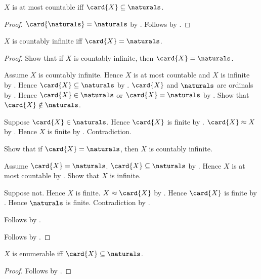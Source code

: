 \begin{theorem}\label{at_most_countable_iff_card_subseteq_naturals}
    $X$ is at most countable iff $\card{X}\subseteq\naturals$.
\end{theorem}
\begin{proof}
    $\card{\naturals}=\naturals$ by .
    Follows by
        .
\end{proof}

\begin{theorem}\label{countably_infinite_iff_card_naturals}
    $X$ is countably infinite iff $\card{X}=\naturals$.
\end{theorem}
\begin{proof}
    Show that if $X$ is countably infinite, then
        $\card{X}=\naturals$.
    \begin{subproof}
        Assume $X$ is countably infinite.
        Hence $X$ is at most countable and $X$ is infinite
            by .
        Hence $\card{X}\subseteq\naturals$
            by .
        $\card{X}$ and $\naturals$ are ordinals
            by .
        Hence $\card{X}\in\naturals$ or
            $\card{X}=\naturals$
            by .
        Show that $\card{X}\notin\naturals$.
        \begin{subproof}
            Suppose $\card{X}\in\naturals$.
            Hence $\card{X}$ is finite
                by .
            $\card{X}\approx X$ by .
            Hence $X$ is finite by .
            Contradiction.
        \end{subproof}
    \end{subproof}
    Show that if $\card{X}=\naturals$, then
        $X$ is countably infinite.
    \begin{subproof}
        Assume $\card{X}=\naturals$.
        $\card{X}\subseteq\naturals$ by .
        Hence $X$ is at most countable
            by .
        Show that $X$ is infinite.
        \begin{subproof}
            Suppose not.
            Hence $X$ is finite.
            $X\approx\card{X}$ by .
            Hence $\card{X}$ is finite by .
            Hence $\naturals$ is finite.
            Contradiction by .
        \end{subproof}
        Follows by .
    \end{subproof}
    Follows by \auto.
\end{proof}

\begin{corollary}\label{enumerable_iff_card_subseteq_naturals}
    $X$ is enumerable iff $\card{X}\subseteq\naturals$.
\end{corollary}
\begin{proof}
    Follows by
        .
\end{proof}
